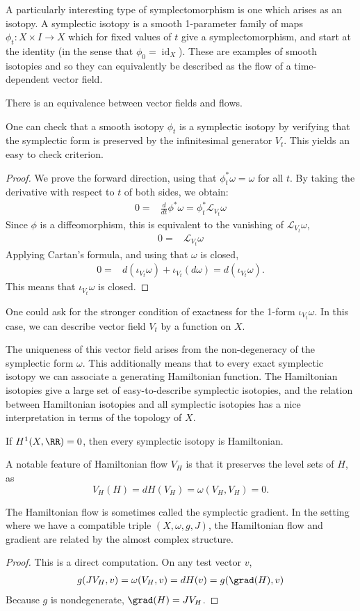 A particularly interesting type of symplectomorphism is one which arises as an isotopy. A symplectic isotopy is a smooth 1-parameter family of maps $\phi_t: X\times I\to X$ which for fixed values of $t$ give a symplectomorphism, and start at the identity (in the sense that $\phi_0=\operatorname{id}_X$). 
These are examples of smooth isotopies and so they can equivalently be described as the flow of a time-dependent vector field.

There is an equivalence between vector fields and flows.

One can check that a smooth isotopy $\phi_t$ is a symplectic isotopy by verifying that the symplectic form is preserved by the infinitesimal generator $V_t$.
This yields an easy to check criterion.

\begin{proof}
    We prove the forward direction, using that $\phi^*_t\omega=\omega$ for all $t$.
    By taking the derivative with respect to $t$ of both sides, we obtain:
\begin{align*}
    0=&\frac{d}{dt}\phi^*\omega
    =\phi^*_t\mathcal L_{V_t}\omega
\end{align*}
Since $\phi$ is a diffeomorphism,  this is equivalent to the vanishing of $\mathcal L_{V_t}\omega$, 
\begin{align*}
 0=& \mathcal L_{V_t}\omega
\end{align*}
Applying Cartan's formula, and using that $\omega$ is closed,
\begin{align*}
0=&d(\iota_{V_t}\omega)+ \iota_{V_t}(d\omega)=d(\iota_{V_t}\omega).
\end{align*}
This means that $\iota_{V_t}\omega$ is closed.
\end{proof}
One could ask for the stronger condition of exactness for the 1-form $\iota_{V_t}\omega$.
In this case, we can describe vector field $V_t$ by a function on $X$. 

The uniqueness of this vector field arises from the non-degeneracy of the symplectic form $\omega$.
This additionally means that to every exact symplectic isotopy we can associate a generating Hamiltonian function.
The Hamiltonian isotopies give a large set of easy-to-describe symplectic isotopies, and the relation between Hamiltonian isotopies and all symplectic isotopies has a nice interpretation in terms of the topology of $X$. 
\begin{corollary}
    If $H^1(X,  \RR)=0$,  then every symplectic isotopy is Hamiltonian. 
\end{corollary}

A notable feature of Hamiltonian flow $V_H$ is that it preserves the level sets of $H$, as 
\[V_H(H)=dH(V_H)=\omega(V_H, V_H)=0.\]

The Hamiltonian flow is sometimes called the symplectic gradient. 
In the setting where we have a compatible triple $(X, \omega,g, J)$, the Hamiltonian flow and gradient are related by the almost complex structure. 

\begin{proof}
    This is a direct computation. On any test vector $v$,
    \begin{align*}
        g(J V_H, v)=\omega(V_H, v)=dH(v)= g(\grad(H), v)
    \end{align*}
    Because $g$ is nondegenerate, $\grad(H)=JV_H$. 
\end{proof}